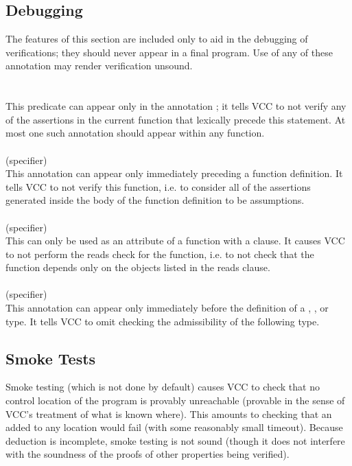 \documentclass[preprint,nocopyrightspace]{sigplanconf}
\begin{document}
{{{\subsection{Debugging}
The features of this section are included only to aid in the debugging
of verifications; they should never appear in a final program. Use of
any of these annotation may render verification unsound.
\\\\
\\
This predicate can appear only in the
annotation ; it tells VCC to not verify
any of the assertions in the current function that lexically precede
this statement. At most one such annotation should appear within any
function. 
\\\\
 (specifier)\\
This annotation can appear only immediately preceding a function
definition. It tells VCC to not verify this function, i.e. to consider
all of the assertions generated inside the body of the function
definition to be assumptions.
\\\\
 (specifier)\\
This  can only be used as an attribute of a  function
with a  clause. It causes VCC to not perform the reads
check for the function, i.e. to not check that the function depends
only on the objects listed in the reads clause.
\\\\
 (specifier)\\
This annotation can appear only immediately before the definition of
a , , or  type. It tells VCC to
omit checking the admissibility of the following type.

\subsection{Smoke Tests}
Smoke testing (which is not done by default) causes VCC to check that no control
location of the program is provably unreachable (provable in the sense
of VCC's treatment of what is known where). This amounts to checking
that an \vcc{\assert(\false)} added to any location would fail (with
some reasonably small timeout). Because deduction is incomplete, smoke
testing is not sound (though it does not interfere with the soundness
of the proofs of other properties being verified).

}}}
\end{document}
